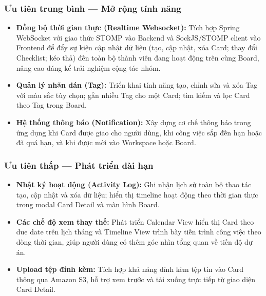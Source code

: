\subsubsection{Ưu tiên trung bình — Mở rộng tính năng}

\begin{itemize}
    \item \textbf{Đồng bộ thời gian thực (Realtime Websocket):} Tích hợp Spring WebSocket với giao thức STOMP vào Backend và SockJS/STOMP client vào Frontend để đẩy sự kiện cập nhật dữ liệu (tạo, cập nhật, xóa Card; thay đổi Checklist; kéo thả) đến toàn bộ thành viên đang hoạt động trên cùng Board, nâng cao đáng kể trải nghiệm cộng tác nhóm.
    \item \textbf{Quản lý nhãn dán (Tag):} Triển khai tính năng tạo, chỉnh sửa và xóa Tag với màu sắc tùy chọn; gắn nhiều Tag cho một Card; tìm kiếm và lọc Card theo Tag trong Board.
    \item \textbf{Hệ thống thông báo (Notification):} Xây dựng cơ chế thông báo trong ứng dụng khi Card được giao cho người dùng, khi công việc sắp đến hạn hoặc đã quá hạn, và khi được mời vào Workspace hoặc Board.
\end{itemize}

\subsubsection{Ưu tiên thấp — Phát triển dài hạn}

\begin{itemize}
    \item \textbf{Nhật ký hoạt động (Activity Log):} Ghi nhận lịch sử toàn bộ thao tác tạo, cập nhật và xóa dữ liệu; hiển thị timeline hoạt động theo thời gian thực trong modal Card Detail và màn hình Board.
    \item \textbf{Các chế độ xem thay thế:} Phát triển Calendar View hiển thị Card theo due date trên lịch tháng và Timeline View trình bày tiến trình công việc theo dòng thời gian, giúp người dùng có thêm góc nhìn tổng quan về tiến độ dự án.
    \item \textbf{Upload tệp đính kèm:} Tích hợp khả năng đính kèm tệp tin vào Card thông qua Amazon S3, hỗ trợ xem trước và tải xuống trực tiếp từ giao diện Card Detail.
\end{itemize}

\clearpage